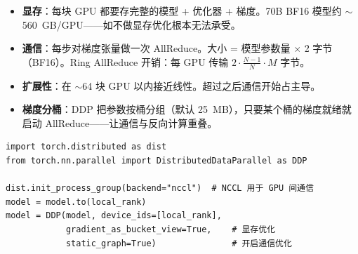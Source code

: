 \begin{itemize}
  \item \textbf{显存}：每块 GPU 都要存完整的模型 + 优化器 + 梯度。70B BF16 模型约 $\sim$560~GB/GPU——如不做显存优化根本无法承受。
  \item \textbf{通信}：每步对梯度张量做一次 AllReduce。大小 = 模型参数量 $\times$ 2 字节（BF16）。Ring AllReduce 开销：每 GPU 传输 $2 \cdot \frac{N-1}{N} \cdot M$ 字节。
  \item \textbf{扩展性}：在 $\sim$64 块 GPU 以内接近线性。超过之后通信开始占主导。
  \item \textbf{梯度分桶}：DDP 把参数按桶分组（默认 25~MB），只要某个桶的梯度就绪就启动 AllReduce——让通信与反向计算重叠。
\end{itemize}

\begin{lstlisting}[style=pythonstyle]
import torch.distributed as dist
from torch.nn.parallel import DistributedDataParallel as DDP

dist.init_process_group(backend="nccl")  # NCCL 用于 GPU 间通信
model = model.to(local_rank)
model = DDP(model, device_ids=[local_rank],
            gradient_as_bucket_view=True,    # 显存优化
            static_graph=True)               # 开启通信优化
\end{lstlisting}

